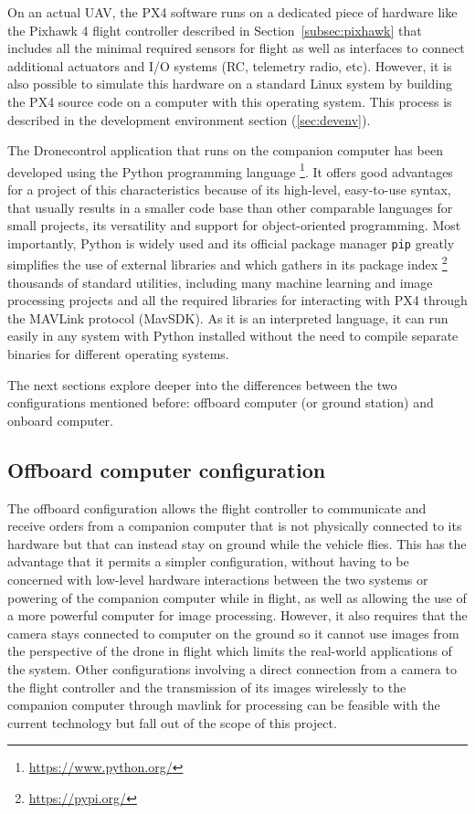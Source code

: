 On an actual UAV, the PX4 software runs on a dedicated piece of hardware like the Pixhawk 4 flight controller described in Section~\ref{subsec:pixhawk} that includes all the minimal required sensors for flight as well as interfaces to connect additional actuators and I/O systems (RC, telemetry radio, etc).
However, it is also possible to simulate this hardware on a standard Linux system by building the PX4 source code on a computer with this operating system.
This process is described in the development environment section (\ref{sec:devenv}).

The Dronecontrol application that runs on the companion computer has been developed using the Python programming language \footnote{\url{https://www.python.org/}}.
It offers good advantages for a project of this characteristics because of its high-level,
easy-to-use syntax, that usually results in a smaller code base than other comparable languages for small projects, its versatility and support for object-oriented programming. 
Most importantly, Python is widely used and its official package manager \texttt{pip} greatly simplifies the use of external libraries and which gathers in its package index \footnote{\url{https://pypi.org/}} thousands of standard utilities,
including many machine learning and image processing projects and all the required libraries for interacting with PX4 through the MAVLink protocol (MavSDK).
As it is an interpreted language, it can run easily in any system with Python installed without the need to compile separate binaries for different operating systems.

The next sections explore deeper into the differences between the two configurations mentioned before: offboard computer (or ground station) and onboard computer.

\subsection{Offboard computer configuration}
\label{subsec:offboard}

The offboard configuration allows the flight controller to communicate and receive orders from a companion computer that is not physically connected to its hardware but that can instead stay on ground while the vehicle flies.
This has the advantage that it permits a simpler configuration, without having to be concerned with low-level hardware interactions between the two systems or powering of the companion computer while in flight, as well as allowing the use of a more powerful computer for image processing.
However, it also requires that the camera stays connected to computer on the ground so it cannot use images from the perspective of the drone in flight which limits the real-world applications of the system.
Other configurations involving a direct connection from a camera to the flight controller and the transmission of its images wirelessly to the companion computer through mavlink for processing can be feasible with the current technology but fall out of the scope of this project.

